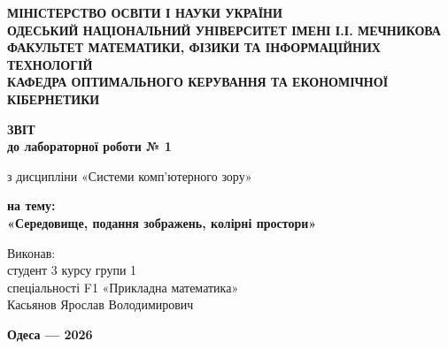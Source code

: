\begin{titlepage}
    \thispagestyle{empty}
    \setlength{\parindent}{0pt}
    
    \begin{center}
        {\fontsize{12pt}{16pt}\selectfont\bfseries
        МІНІСТЕРСТВО ОСВІТИ І НАУКИ УКРАЇНИ\\[3pt]
        ОДЕСЬКИЙ НАЦІОНАЛЬНИЙ УНІВЕРСИТЕТ ІМЕНІ І.І. МЕЧНИКОВА\\[3pt]
        ФАКУЛЬТЕТ МАТЕМАТИКИ, ФІЗИКИ ТА ІНФОРМАЦІЙНИХ ТЕХНОЛОГІЙ\\[3pt]
        КАФЕДРА ОПТИМАЛЬНОГО КЕРУВАННЯ ТА ЕКОНОМІЧНОЇ КІБЕРНЕТИКИ\par}
    \end{center}

    \vspace{1.5cm}

    \begin{center}
        {\fontsize{18pt}{22pt}\selectfont\bfseries ЗВІТ\\
        до лабораторної роботи № 1\par}
        \vspace{0.4cm}
        {\fontsize{14pt}{18pt}\selectfont
        з дисципліни «Системи комп’ютерного зору»\par}
        \vspace{0.4cm}
        {\fontsize{16pt}{20pt}\selectfont\bfseries
        на тему:\\[6pt]
        «Середовище, подання зображень, колірні простори»\par}
    \end{center}

    \vspace{1.5cm}

    \hfill
    \begin{minipage}{0.60\textwidth}
        \raggedright
        {\fontsize{14pt}{19pt}\selectfont
        Виконав:\\[2pt]
        студент 3 курсу групи 1\\[2pt]
        спеціальності F1 «Прикладна математика»\\[2pt]
        Касьянов Ярослав Володимирович
        
        \vspace{0.8cm}
        
 
        }
    \end{minipage}

    \vfill

    \begin{center}
        {\fontsize{12pt}{14pt}\selectfont\bfseries Одеса --- 2026\par}
    \end{center}
\end{titlepage}

\setcounter{page}{2}
